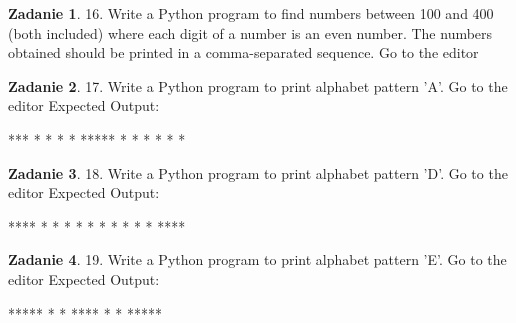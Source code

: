 \documentclass[11pt]{article}
\theoremstyle{definition}
\newtheorem{zadanie}{Zadanie}
\begin{document}
\begin{zadanie}


16. Write a Python program to find numbers between 100 and 400 (both included) where each digit of a number is an even number. The numbers obtained should be printed in a comma-separated sequence. Go to the editor


\end{zadanie}

\begin{zadanie}


17. Write a Python program to print alphabet pattern 'A'. Go to the editor
Expected Output:

  ***                                                                   
 *   *                                                                  
 *   *                                                                  
 *****                                                                  
 *   *                                                                  
 *   *                                                                  
 *   *



\end{zadanie}

\begin{zadanie}


18. Write a Python program to print alphabet pattern 'D'. Go to the editor
Expected Output:

 ****                                                                   
 *   *                                                                  
 *   *                                                                  
 *   *                                                                  
 *   *                                                                  
 *   *                                                                  
 **** 



\end{zadanie}

\begin{zadanie}


19. Write a Python program to print alphabet pattern 'E'. Go to the editor
Expected Output:

 *****                                                                  
 *                                                                      
 *                                                                      
 ****                                                                   
 *                                                                      
 *                                                                      
 *****



\end{zadanie}
\end{document}
